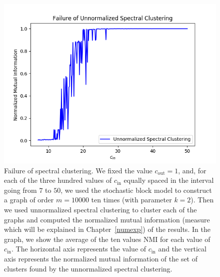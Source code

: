 \begin{figure}[h]
\begin{center}
\includegraphics[width=14cm]{figures/spec_fail.png}
\end{center}
   \caption[Failure of spectral clustering]{Failure of spectral clustering. We fixed the value $c_\text{out} = 1$, and, for each of the three hundred values of $c_\text{in}$ equally spaced in the interval going from $7$ to $50$,  we used the stochastic block model to construct a graph of order $m = 10000$ ten times (with parameter $k=2$). Then we used unnormalized spectral clustering to cluster each of the graphs and computed the normalized mutual information (measure which will be explained in Chapter~\vref{numexp}) of the results. In the graph, we show the average of the ten values NMI for each value of $c_\text{in}$. The horizontal axis represents the value of $c_\text{in}$ and the vertical axis represents the normalized mutual information of the set of clusters found by the unnormalized spectral clustering.}
   \label{spec_fail}
\end{figure}

